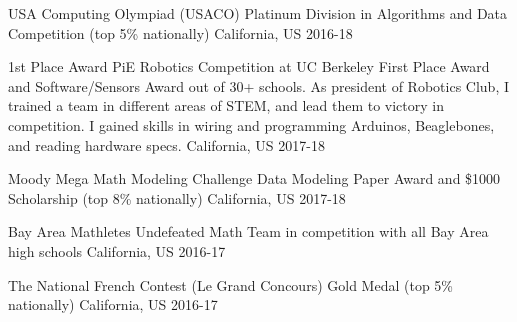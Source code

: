 



\begin{cvhonors}
  
  \cvhonor
    {USA Computing Olympiad (USACO)} %
    {Platinum Division in Algorithms and Data Competition (top 5\% nationally)}
    {California, US} %
    {2016-18} %
    
  \cvhonor
    {1st Place Award PiE Robotics Competition at UC Berkeley}  %
    {First Place Award and Software/Sensors Award out of 30+ schools. As president of Robotics Club, I trained a team in different areas of STEM, and lead them to victory in competition. I gained skills in wiring and programming Arduinos, Beaglebones, and reading hardware specs.}
    {California, US} %
    {2017-18} %

  \cvhonor
    {Moody Mega Math Modeling Challenge} %
    {Data Modeling Paper Award and \$1000 Scholarship (top 8\% nationally)}
    {California, US} %
    {2017-18} %
 
  \cvhonor
    {Bay Area Mathletes} %
    {Undefeated Math Team in competition with all Bay Area high schools}
    {California, US} %
    {2016-17} %

  \cvhonor
    {The National French Contest (Le Grand Concours)} %
    {Gold Medal (top 5\% nationally)}
    {California, US} %
    {2016-17} %
      
\end{cvhonors}
